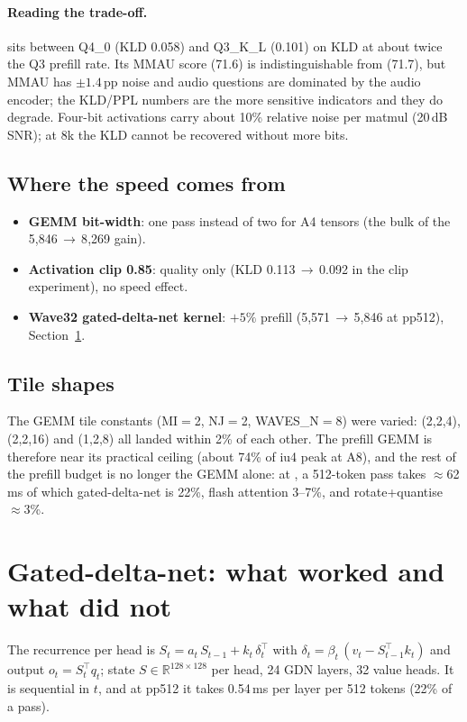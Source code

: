 \documentclass[10pt,a4paper]{article}
\newcommand{\tx}[1]{\texttt{\detokenize{#1}}}
\begin{document}
\paragraph{Reading the trade-off.} \tx{fast} sits between Q4\_0 (KLD 0.058) and Q3\_K\_L (0.101) on KLD at about twice the
Q3 prefill rate. Its MMAU score (71.6) is indistinguishable from \tx{quality} (71.7), but MMAU has $\pm1.4$\,pp noise and
audio questions are dominated by the audio encoder; the KLD/PPL numbers are the more sensitive indicators and they do degrade.
Four-bit activations carry about 10\% relative noise per matmul (20\,dB SNR); at 8k the KLD cannot be recovered without
more bits.

\subsection{Where the speed comes from}
\begin{itemize}
\item \textbf{GEMM bit-width}: one pass instead of two for A4 tensors (the bulk of the 5{,}846\,$\to$\,8{,}269 gain).
\item \textbf{Activation clip 0.85}: quality only (KLD 0.113\,$\to$\,0.092 in the clip experiment), no speed effect.
\item \textbf{Wave32 gated-delta-net kernel}: $+5\%$ prefill (5{,}571\,$\to$\,5{,}846 at pp512), Section~\ref{sec:gdn}.
\end{itemize}

\subsection{Tile shapes}
\label{sec:tile}
The GEMM tile constants (MI$=$2, NJ$=$2, WAVES\_N$=$8) were varied: (2,2,4), (2,2,16) and (1,2,8) all landed within 2\% of
each other. The prefill GEMM is therefore near its practical ceiling (about 74\% of iu4 peak at A8), and the rest of the
prefill budget is no longer the GEMM alone: at \tx{fast}, a 512-token pass takes $\approx$62\,ms of which gated-delta-net is
22\%, flash attention 3--7\%, and rotate+quantise $\approx$3\%.

\section{Gated-delta-net: what worked and what did not}
\label{sec:gdn}

The recurrence per head is $S_t = a_t\,S_{t-1} + k_t\,\delta_t^{\!\top}$ with $\delta_t = \beta_t\,(v_t - S_{t-1}^{\!\top}k_t)$ and
output $o_t=S_t^{\!\top}q_t$; state $S\in\mathbb{R}^{128\times128}$ per head, 24 GDN layers, 32 value heads. It is
sequential in $t$, and at pp512 it takes 0.54\,ms per layer per 512 tokens (22\% of a \tx{fast} pass).
\end{document}
